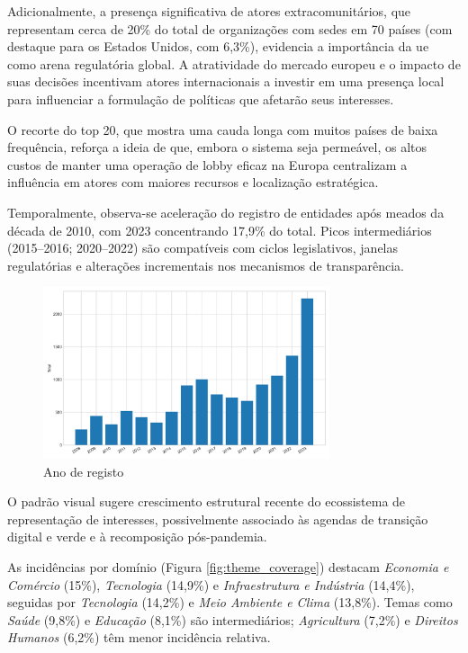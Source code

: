 Adicionalmente, a presença significativa de atores extracomunitários, que representam cerca de 20\% do total de organizações com sedes em 70 países (com destaque para os Estados Unidos, com 6,3\%), evidencia a importância da \acrshort{ue} como arena regulatória global. A atratividade do mercado europeu e o impacto de suas decisões incentivam atores internacionais a investir em uma presença local para influenciar a formulação de políticas que afetarão seus interesses. 

O recorte do top 20, que mostra uma cauda longa com muitos países de baixa frequência, reforça a ideia de que, embora o sistema seja permeável, os altos custos de manter uma operação de lobby eficaz na Europa centralizam a influência em atores com maiores recursos e localização estratégica.

Temporalmente, observa-se aceleração do registro de entidades após meados da década de 2010, com 2023 concentrando 17,9\% do total. Picos intermediários (2015--2016; 2020--2022) são compatíveis com ciclos legislativos, janelas regulatórias e alterações incrementais nos mecanismos de transparência.

\begin{figure}[!htbp]
\centering
\includegraphics[width=0.75\textwidth]{figures/year_distribution.png}
\caption{Ano de registo}
\end{figure}

O padrão visual sugere crescimento estrutural recente do ecossistema de representação de interesses, possivelmente associado às agendas de transição digital e verde e à recomposição pós-pandemia.

As incidências por domínio (Figura \ref{fig:theme_coverage}) destacam \textit{Economia e Comércio} (15\%), \textit{Tecnologia} (14,9\%) e \textit{Infraestrutura e Indústria} (14,4\%), seguidas por \textit{Tecnologia} (14,2\%) e \textit{Meio Ambiente e Clima} (13,8\%). Temas como \textit{Saúde} (9,8\%) e \textit{Educação} (8,1\%) são intermediários; \textit{Agricultura} (7,2\%) e \textit{Direitos Humanos} (6,2\%) têm menor incidência relativa.

